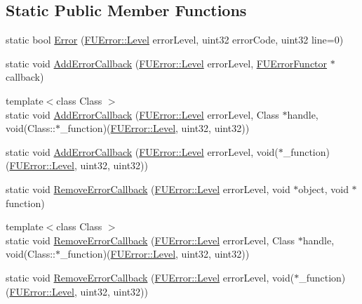 \subsection*{Static Public Member Functions}
\begin{DoxyCompactItemize}
\item 
static bool \hyperlink{classFUError_a9110b516618c009f9d7385b9be5f5aec}{Error} (\hyperlink{classFUError_ac4b066f99c221e180ecfe9183fabbf3c}{FUError::Level} errorLevel, uint32 errorCode, uint32 line=0)
\item 
static void \hyperlink{classFUError_abfccbf69fc3aab1c0c93d734d835f239}{AddErrorCallback} (\hyperlink{classFUError_ac4b066f99c221e180ecfe9183fabbf3c}{FUError::Level} errorLevel, \hyperlink{classIFunctor3}{FUErrorFunctor} $\ast$callback)
\item 
{\footnotesize template$<$class Class $>$ }\\static void \hyperlink{classFUError_af997111fb6cfdb5a0aab1ecaf1252e8e}{AddErrorCallback} (\hyperlink{classFUError_ac4b066f99c221e180ecfe9183fabbf3c}{FUError::Level} errorLevel, Class $\ast$handle, void(Class::$\ast$\_\-function)(\hyperlink{classFUError_ac4b066f99c221e180ecfe9183fabbf3c}{FUError::Level}, uint32, uint32))
\item 
static void \hyperlink{classFUError_a03947f8a2510b8bfef8e93e67892d12d}{AddErrorCallback} (\hyperlink{classFUError_ac4b066f99c221e180ecfe9183fabbf3c}{FUError::Level} errorLevel, void($\ast$\_\-function)(\hyperlink{classFUError_ac4b066f99c221e180ecfe9183fabbf3c}{FUError::Level}, uint32, uint32))
\item 
static void \hyperlink{classFUError_aa3de1b87525cf37fb279b20164429a76}{RemoveErrorCallback} (\hyperlink{classFUError_ac4b066f99c221e180ecfe9183fabbf3c}{FUError::Level} errorLevel, void $\ast$object, void $\ast$function)
\item 
{\footnotesize template$<$class Class $>$ }\\static void \hyperlink{classFUError_a80c5c18c086f567648f00c0b4ab8c74f}{RemoveErrorCallback} (\hyperlink{classFUError_ac4b066f99c221e180ecfe9183fabbf3c}{FUError::Level} errorLevel, Class $\ast$handle, void(Class::$\ast$\_\-function)(\hyperlink{classFUError_ac4b066f99c221e180ecfe9183fabbf3c}{FUError::Level}, uint32, uint32))
\item 
static void \hyperlink{classFUError_a96ca4bf271028a7956c71d4d1af72911}{RemoveErrorCallback} (\hyperlink{classFUError_ac4b066f99c221e180ecfe9183fabbf3c}{FUError::Level} errorLevel, void($\ast$\_\-function)(\hyperlink{classFUError_ac4b066f99c221e180ecfe9183fabbf3c}{FUError::Level}, uint32, uint32))

\end{DoxyCompactItemize}

